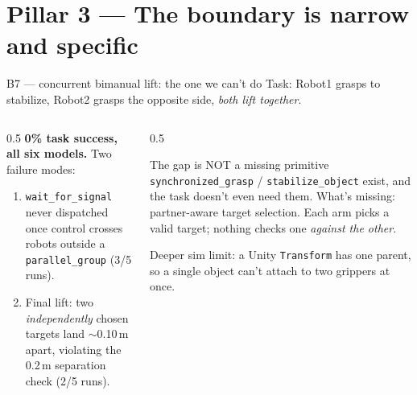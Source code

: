 \documentclass[aspectratio=169,11pt]{beamer}
\begin{document}
\section{Pillar 3 --- The boundary is narrow and specific}

\begin{frame}{B7 --- concurrent bimanual lift: the one we can't do}
	\footnotesize Task: Robot1 grasps to stabilize, Robot2 grasps the opposite side, \emph{both lift together}.
	\vspace{0.3em}
	\begin{columns}[T]
		\begin{column}{0.5\textwidth}
			\textbf{0\% task success, all six models.} Two failure modes:
			\begin{enumerate}\footnotesize
				\item \texttt{wait\_for\_signal} never dispatched once control crosses robots
				      outside a \texttt{parallel\_group} (3/5 runs).
				\item Final lift: two \emph{independently} chosen targets land $\sim$0.10\,m apart,
				      violating the 0.2\,m separation check (2/5 runs).
			\end{enumerate}
		\end{column}
		\begin{column}{0.5\textwidth}
			\begin{alertblock}{The gap is NOT a missing primitive}
				\footnotesize
				\texttt{synchronized\_grasp} / \texttt{stabilize\_object} exist, and the task
				doesn't even need them. What's missing: \alert{partner-aware target selection}.
				Each arm picks a valid target; nothing checks one \emph{against the other}.
			\end{alertblock}
			\footnotesize\vspace{0.3em}
			Deeper sim limit: a Unity \texttt{Transform} has one parent, so a single object
			can't attach to two grippers at once.
		\end{column}
	\end{columns}
\end{frame}
\end{document}
